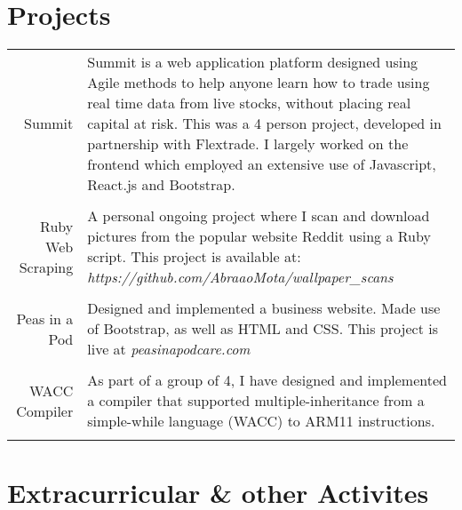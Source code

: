 \documentclass[a4paper,10pt]{article}
\begin{document}
	\section*{Projects}
	
	\begin{tabular}{r|p{12cm}}
		
		Summit  & Summit is a web application platform designed using Agile methods to help anyone learn how to trade using real time data from live stocks, without placing real capital at risk. This was a 4 person project, developed in partnership with Flextrade. I largely worked on the frontend which employed an extensive use of Javascript, React.js and Bootstrap.
		\\\multicolumn{2}{c}{} \\
		
		Ruby Web Scraping & A personal ongoing project where I scan and download pictures from the popular website Reddit using a Ruby script. This project is available at: \textit{https://github.com/AbraaoMota/wallpaper\_scans}
		\\\multicolumn{2}{c}{} \\
		
		Peas in a Pod & Designed and implemented a business website. Made use of Bootstrap, as well as HTML and CSS. This project is live at \textit{peasinapodcare.com}
		 \\\multicolumn{2}{c}{} \\
		 
		WACC Compiler & As part of a group of 4, I have designed and implemented a compiler that supported multiple-inheritance from a simple-while language (WACC) to ARM11 instructions. 
		\\\multicolumn{2}{c}{} \\
		
	\end{tabular}
	
	\section*{Extracurricular \& other Activites}
	
\end{document}
